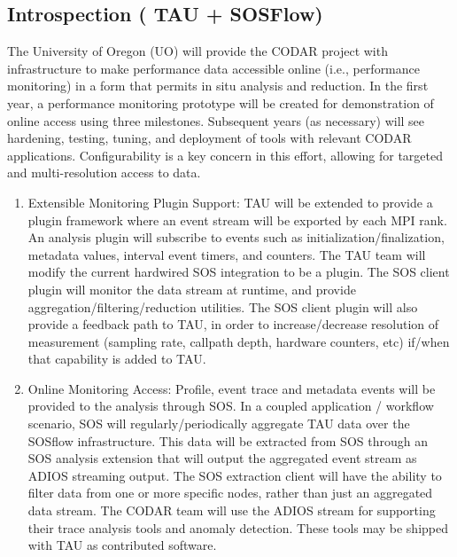 \subsection{Introspection ( TAU + SOSFlow)}
The University of Oregon (UO) will provide the CODAR project with infrastructure to make performance data accessible online (i.e., performance monitoring) in a form that permits in situ analysis and reduction. In the first year, a performance monitoring prototype will be created for demonstration of online access using three milestones. Subsequent years (as necessary) will see hardening, testing, tuning, and deployment of tools with relevant CODAR applications.  Configurability is a key concern in this effort, allowing for targeted and multi-resolution access to data.
\begin{enumerate}
\item Extensible Monitoring Plugin Support: TAU will be extended to provide a plugin framework where an event stream will be exported by each MPI rank. An analysis plugin will subscribe to events such as initialization/finalization, metadata values, interval event timers, and counters.  The TAU team will modify the current hardwired SOS integration to be a plugin. The SOS client plugin will monitor the data stream at runtime, and provide aggregation/filtering/reduction utilities.  The SOS client plugin will also provide a feedback path to TAU, in order to increase/decrease resolution of measurement (sampling rate, callpath depth, hardware counters, etc) if/when that capability is added to TAU.
\item Online Monitoring Access: Profile, event trace and metadata events will be provided to the analysis through SOS\cite{Chad}. In a coupled application / workflow scenario, SOS will regularly/periodically aggregate TAU data over the SOSflow infrastructure.  This data will be extracted from SOS through an SOS analysis extension that will output the aggregated event stream as ADIOS streaming output.  The SOS extraction client will have the ability to filter data from one or more specific nodes, rather than just an aggregated data stream.  The CODAR team will use the ADIOS stream for supporting their trace analysis tools and anomaly detection. These tools may be shipped with TAU as contributed software.
\end{enumerate}

